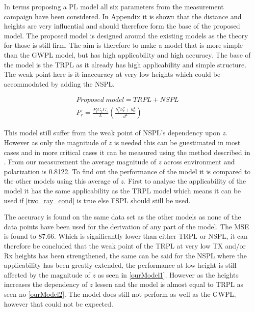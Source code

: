 


In terms proposing a PL model all six parameters from the measurement campaign have been considered. In Appendix it is shown that the distance and heights are very influential and should therefore form the base of the proposed model. %
The proposed model is designed around the existing models as the theory for those is still firm. The aim is therefore to make a model that is more simple than the GWPL model, but has high applicability and high accuracy. The base of the model is the TRPL as it already has high applicability and simple structure. The weak point here is it inaccuracy at very low heights which could be accommodated by adding the NSPL. 

\begin{align}
Proposed\; model = TRPL + NSPL \\
P_r = \frac{P_t G_t G_r }{L}\left(\frac{h_t^2 h_r^2+h_0^4}{d^4}\right)
\end{align}

This model still suffer from the weak point of NSPL's dependency upon $z$. However as only the magnitude of $z$ is needed this can be guestimated in most cases and in more critical cases it can be measured using the method described in \cite{Kim}. From our measurement the average magnitude of $z$ across environment and polarization is 0.8122. To find out the performance of the model it is compared to the other models using this average of $z$. First to analyse the applicability of the model it has the same applicability as the TRPL model which means it can be used if \eqref{two_ray_cond} is true else FSPL should still be used. 




The accuracy is found on the same data set as the other models as none of the data points have been used for the derivation of any part of the model. The MSE is found to 87.66. Which is significantly lower than either TRPL or NSPL, it can therefore be concluded that the weak point of the TRPL at very low TX and/or Rx heights has been strengthened, the same can be said for the NSPL where the applicability has been greatly extended, the performance at low height is still affected by the magnitude of $z$ as seen in \autoref{ourModel1}. However as the heights increases the dependency of $z$ lessen and the model is almost equal to TRPL as seen no \autoref{ourModel2}. The model does still not perform as well as the GWPL, however that could not be expected.

